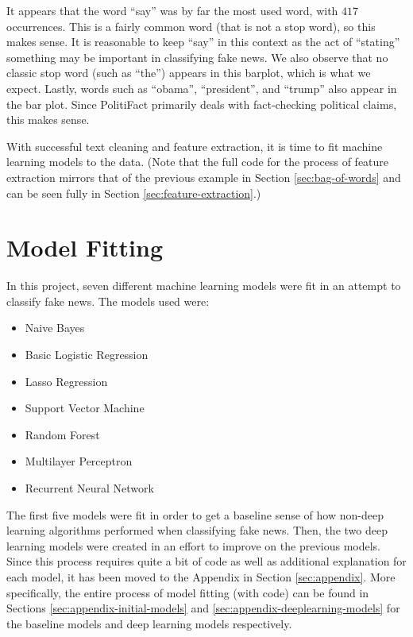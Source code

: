\documentclass[12pt]{article}
\providecommand{\tightlist}{%
  \setlength{\itemsep}{0pt}\setlength{\parskip}{0pt}}
\begin{document}
It appears that the word ``say'' was by far the most used word, with
\(417\) occurrences. This is a fairly common word (that is not a stop
word), so this makes sense. It is reasonable to keep ``say'' in this
context as the act of ``stating'' something may be important in
classifying fake news. We also observe that no classic stop word (such
as ``the'') appears in this barplot, which is what we expect. Lastly,
words such as ``obama'', ``president'', and ``trump'' also appear in the
bar plot. Since PolitiFact primarily deals with fact-checking political
claims, this makes sense.

With successful text cleaning and feature extraction, it is time to fit
machine learning models to the data. (Note that the full code for the
process of feature extraction mirrors that of the previous example in
Section \ref{sec:bag-of-words} and can be seen fully in Section
\ref{sec:feature-extraction}.)

\newpage

\newpage

\hypertarget{model-fitting}{%
\section{Model Fitting}\label{model-fitting}}

In this project, seven different machine learning models were fit in an
attempt to classify fake news. The models used were:

\begin{itemize}
\tightlist
\item
  Naive Bayes
\item
  Basic Logistic Regression
\item
  Lasso Regression
\item
  Support Vector Machine
\item
  Random Forest
\item
  Multilayer Perceptron
\item
  Recurrent Neural Network
\end{itemize}

The first five models were fit in order to get a baseline sense of how
non-deep learning algorithms performed when classifying fake news. Then,
the two deep learning models were created in an effort to improve on the
previous models. Since this process requires quite a bit of code as well
as additional explanation for each model, it has been moved to the
Appendix in Section \ref{sec:appendix}. More specifically, the entire
process of model fitting (with code) can be found in Sections
\ref{sec:appendix-initial-models} and
\ref{sec:appendix-deeplearning-models} for the baseline models and deep
learning models respectively.
\end{document}
